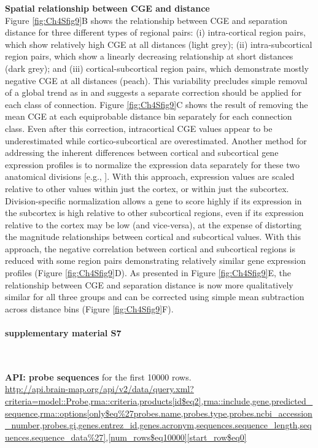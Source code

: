 \documentclass[10pt,A4]{article}
\begin{document}
\textbf{Spatial relationship between CGE and distance}\\
Figure \ref{fig:Ch4Sfig9}B shows the relationship between CGE and separation distance for three different types of regional pairs: (i) intra-cortical region pairs, which show relatively high CGE at all distances (light grey); (ii) intra-subcortical region pairs, which show a linearly decreasing relationship at short distances (dark grey); and (iii) cortical-subcortical region pairs, which demonstrate mostly negative CGE at all distances (peach). This variability precludes simple removal of a global trend as in \citep{Fulcher2016} and suggests a separate correction should be applied for each class of connection. Figure \ref{fig:Ch4Sfig9}C shows the result of removing the mean CGE at each equiprobable distance bin separately for each connection class. Even after this correction, intracortical CGE values appear to be underestimated while cortico-subcortical are overestimated. Another method for addressing the inherent differences between cortical and subcortical gene expression profiles is to normalize the expression data separately for these two anatomical divisions [e.g., \citet{Anderson2018}]. With this approach, expression values are scaled relative to other values within just the cortex, or within just the subcortex. Division-specific normalization allows a gene to score highly if its expression in the subcortex is high relative to other subcortical regions, even if its expression relative to the cortex may be low (and vice-versa), at the expense of distorting the magnitude relationships between cortical and subcortical values. With this approach, the negative correlation between cortical and subcortical regions is reduced with some region pairs demonstrating relatively similar gene expression profiles (Figure \ref{fig:Ch4Sfig9}D). As presented in Figure \ref{fig:Ch4Sfig9}E, the relationship between CGE and separation distance is now more qualitatively similar for all three groups and can be corrected using simple mean subtraction across distance bins (Figure \ref{fig:Ch4Sfig9}F).

\paragraph*{supplementary material S7}\mbox{}\\
\label{SItext7}

\textbf{API: probe sequences} for the first \num{10000} rows.\\
\url{http://api.brain-map.org/api/v2/data/query.xml?criteria=model::Probe,rma::criteria,products[id$eq2],rma::include,gene,predicted_sequence,rma::options[only$eq%27probes.name,probes.type,probes.ncbi_accession_number,probes.gi,genes.entrez_id,genes.acronym,sequences.sequence_length,sequences.sequence_data%27],[num_rows$eq10000][start_row$eq0]}
\end{document}
